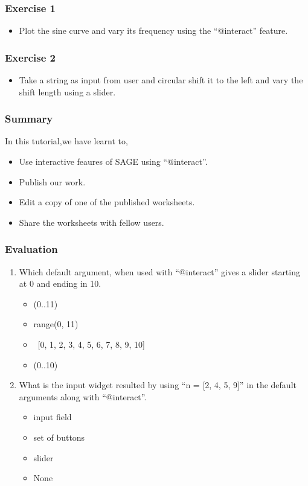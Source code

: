\documentclass[presentation]{beamer}
\begin{document}
\begin{frame}
\frametitle{Exercise 1}
\label{sec-4}


\begin{itemize}
\item Plot the sine curve and vary its frequency using the ``@interact'' feature.
\end{itemize}
\end{frame}
\begin{frame}
\frametitle{Exercise 2}
\label{sec-5}


\begin{itemize}
\item Take a string as input from user and circular shift it to the left and
  vary the shift length using a slider.
\end{itemize}
\end{frame}
\begin{frame}
\frametitle{Summary}
\label{sec-6}

  In this tutorial,we have learnt to,


\begin{itemize}
\item Use interactive feaures of SAGE using ``@interact''.
\item Publish our work.
\item Edit a copy of one of the published worksheets.
\item Share the worksheets with fellow users.
\end{itemize}
\end{frame}
\begin{frame}
\frametitle{Evaluation}
\label{sec-7}


\begin{enumerate}
\item Which default argument, when used with ``@interact'' gives a slider 
    starting at 0 and ending in 10.
\begin{itemize}
\item (0..11)
\item range(0, 11)
\item~[0, 1, 2, 3, 4, 5, 6, 7, 8, 9, 10]~
\item (0..10)
\end{itemize}
\vspace{5pt}
\item What is the input widget resulted by using ``n = [2, 4, 5, 9]'' in the
    default arguments along with ``@interact''.
\begin{itemize}
\item input field
\item set of buttons
\item slider
\item None
\end{itemize}
\end{enumerate}
\end{frame}
\end{document}
